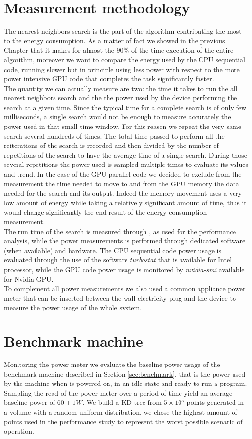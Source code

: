 \section{Measurement methodology}
The nearest neighbors search is the part of the algorithm contributing the most to the energy consumption. As a matter of fact we showed in the previous Chapter that it makes for almost the $90\%$ of the time execution of the entire algorithm, moreover we want to compare the energy used by the CPU sequential code, running slower but in principle using less power with respect to the more power intensive GPU code that completes the task significantly faster.\\ 
The quantity we can actually measure are two: the time it takes to run the all nearest neighbors search and the the power used by the device performing the search at a given time.
Since the typical time for a complete search is of only few milliseconds, a single search would not be enough to measure accurately the power used in that small time window. For this reason we repeat the very same search several hundreds of times. The total time passed to perform all the reiterations of the search is recorded and then divided by the number of repetitions of the search to have the average time of a single search. During those several repetitions the power used is sampled multiple times to evaluate its values and trend. In the case of the GPU parallel code we decided to exclude from the measurement the time needed to move to and from the GPU memory the data needed for the search and its output. Indeed the memory movement uses a very low amount of energy while taking a relatively significant amount of time, thus it would change significantly the end result of the energy consumption measurement.\\
The run time of the search is measured through , as used for the performance analysis, while the power measurements is performed through dedicated software (when available) and hardware. The CPU sequential code power usage is evaluated through the use of the software \textit{turbostat} that is available for Intel processor, while the GPU code power usage is monitored by \textit{nvidia-smi} available for Nvidia GPU.\\
To complement all power measurements we also used a common appliance power meter that can be inserted between the wall electricity plug and the device to measure the power usage of the whole system.

\section{Benchmark machine}
Monitoring the power meter we evaluate the baseline power usage of the benchmark machine described in Section \ref{sec:benchmark}, that is the power used by the machine when is powered on, in an idle state and ready to run a program. Sampling the read of the power meter over a period of time yield an average baseline power of $60 \pm 1 \unit{W}$.
We build a KD-tree from $5 \times 10^5$ points generated in a volume with a random uniform distribution, we chose the highest amount of points used in the performance study to represent the worst possible scenario of operation.

